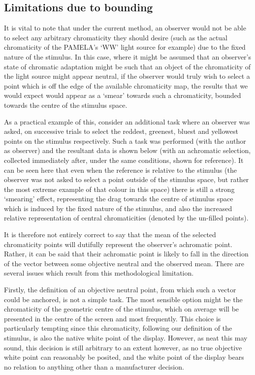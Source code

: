 \subsection{Limitations due to bounding} \label{sec:bounding}

It is vital to note that under the current method, an observer would not be able to select any arbitrary chromaticity they should desire (such as the actual chromaticity of the \gls{PAMELA}'s `WW' light source for example) due to the fixed nature of the stimulus. In this case, where it might be assumed that an observer's state of chromatic adaptation might be such that an object of the chromaticity of the light source might appear neutral, if the observer would truly wish to select a point which is off the edge of the available chromaticity map, the results that we would expect would appear as a `smear' towards such a chromaticity, bounded towards the centre of the stimulus space.

As a practical example of this, consider an additional task where an observer was asked, on successive trials to select the reddest, greenest, bluest and yellowest points on the stimulus respectively. Such a task was performed (with the author as observer) and the resultant data is shown below (with an achromatic selection, collected immediately after, under the same conditions, shown for reference). It can be seen here that even when the reference is relative to the stimulus (the observer was not asked to select a point outside of the stimulus space, but rather the most extreme example of that colour in this space) there is still a strong `smearing' effect, representing the drag towards the centre of stimulus space which is induced by the fixed nature of the stimulus, and also the increased relative representation of central chromaticities (denoted by the un-filled points).


It is therefore not entirely correct to say that the mean of the selected chromaticity points will dutifully represent the observer's achromatic point. Rather, it can be said that their achromatic point is likely to fall in the direction of the vector between some objective neutral and the observed mean. There are several issues which result from this methodological limitation.

Firstly, the definition of an objective neutral point, from which such a vector could be anchored, is not a simple task. The most sensible option might be the chromaticity of the geometric centre of the stimulus, which on average will be presented in the centre of the screen and most frequently. This choice is particularly tempting since this chromaticity, following our definition of the stimulus, is also the native white point of the display. However, as neat this may sound, this decision is still arbitrary to an extent however, as no true objective white point can reasonably be posited, and the white point of the display bears no relation to anything other than a manufacturer decision.

